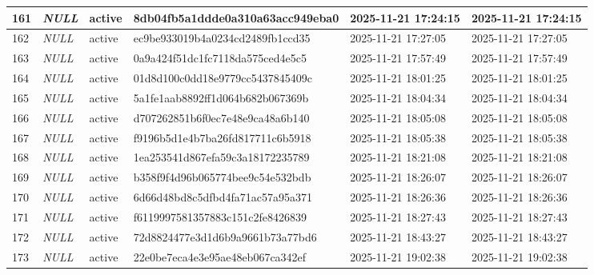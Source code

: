 \begin{longtable}{|l|l|l|l|l|l|}
161 & \textit{NULL} & active & 8db04fb5a1ddde0a310a63acc949eba0 & 2025-11-21 17:24:15 & 2025-11-21 17:24:15 \\ \hline 
162 & \textit{NULL} & active & ec9be933019b4a0234cd2489fb1ccd35 & 2025-11-21 17:27:05 & 2025-11-21 17:27:05 \\ \hline 
163 & \textit{NULL} & active & 0a9a424f51dc1fc7118da575ced4e5c5 & 2025-11-21 17:57:49 & 2025-11-21 17:57:49 \\ \hline 
164 & \textit{NULL} & active & 01d8d100c0dd18e9779cc5437845409c & 2025-11-21 18:01:25 & 2025-11-21 18:01:25 \\ \hline 
165 & \textit{NULL} & active & 5a1fe1aab8892ff1d064b682b067369b & 2025-11-21 18:04:34 & 2025-11-21 18:04:34 \\ \hline 
166 & \textit{NULL} & active & d707262851b6f0ec7e48e9ca48a6b140 & 2025-11-21 18:05:08 & 2025-11-21 18:05:08 \\ \hline 
167 & \textit{NULL} & active & f9196b5d1e4b7ba26fd817711c6b5918 & 2025-11-21 18:05:38 & 2025-11-21 18:05:38 \\ \hline 
168 & \textit{NULL} & active & 1ea253541d867efa59c3a18172235789 & 2025-11-21 18:21:08 & 2025-11-21 18:21:08 \\ \hline 
169 & \textit{NULL} & active & b358f9f4d96b065774bee9c54e532bdb & 2025-11-21 18:26:07 & 2025-11-21 18:26:07 \\ \hline 
170 & \textit{NULL} & active & 6d66d48bd8c5dfbd4fa71ac57a95a371 & 2025-11-21 18:26:36 & 2025-11-21 18:26:36 \\ \hline 
171 & \textit{NULL} & active & f6119997581357883c151c2fe8426839 & 2025-11-21 18:27:43 & 2025-11-21 18:27:43 \\ \hline 
172 & \textit{NULL} & active & 72d8824477e3d1d6b9a9661b73a77bd6 & 2025-11-21 18:43:27 & 2025-11-21 18:43:27 \\ \hline 
173 & \textit{NULL} & active & 22e0be7eca4e3e95ae48eb067ca342ef & 2025-11-21 19:02:38 & 2025-11-21 19:02:38 \\ \hline 
 \end{longtable}

